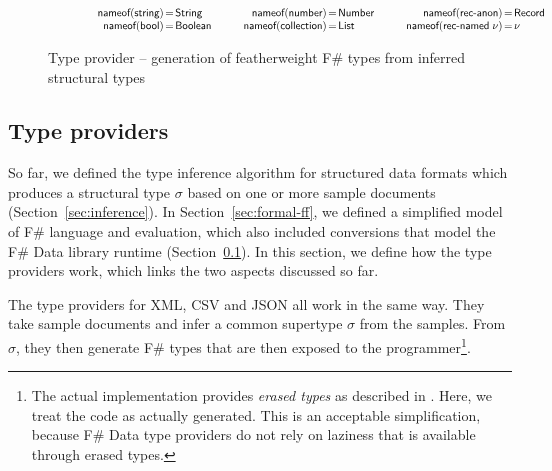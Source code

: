 \documentclass[preprint]{sigplanconf}
\newcommand{\ident}[1]{\textnormal{\sffamily #1}}
\newcommand{\narrow}[1]{\hspace{-0.85em} #1 \hspace{-0.85em}}
\newcommand{\nameoftag}{\ident{nameof}}
\begin{document}
\begin{figure}
\vspace{-0.5em}
\noindent
\begin{equation*}
\qquad
\qquad
\begin{array}{rcl}
 \nameoftag(\ident{string}) &\narrow{=}& \ident{String} \\
 \nameoftag(\ident{bool}) &\narrow{=}& \ident{Boolean} \\
\end{array}
\qquad
\begin{array}{rcl}
 \nameoftag(\ident{number}) &\narrow{=}& \ident{Number} \\
 \nameoftag(\ident{collection}) &\narrow{=}& \ident{List} \\
\end{array}
\qquad
\begin{array}{rcl}
 \nameoftag(\ident{rec-anon}) &\narrow{=}& \ident{Record} \\
 \nameoftag(\ident{rec-named}\;\nu) &\narrow{=}& \nu \\
\end{array}
\end{equation*}

\caption{Type provider -- generation of featherweight F\# types from inferred structural types}
\label{fig:tp-generation}
\vspace{-0.5em}
\end{figure}


\subsection{Type providers}
\label{sec:formal-tp}

So far, we defined the type inference algorithm for structured data formats which produces a structural
type $\sigma$ based on one or more sample documents (Section~\ref{sec:inference}). In Section~\ref{sec:formal-ff},
we defined a simplified model of F\# language and evaluation, which also included conversions that
model the F\# Data library runtime (Section~\ref{sec:formal-tp}). In this section, we define how
the type providers work, which links the two aspects discussed so far.

The type providers for XML, CSV and JSON all work in the same way. They take sample documents and infer a common
supertype $\sigma$ from the samples. From $\sigma$, they then generate F\# types that are then exposed to the
programmer\footnote{The actual implementation provides \emph{erased types} as described in \cite{fsharp-typeprov}. 
Here, we treat the code as actually generated. This is an acceptable simplification, because F\# Data type providers do not 
rely on laziness that is available through erased types.}. 
\end{document}

